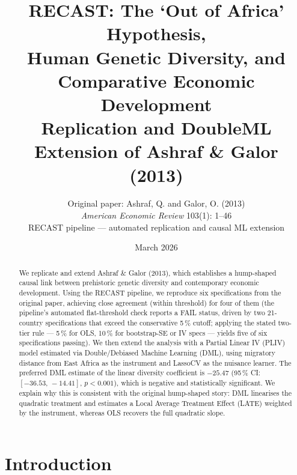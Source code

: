 \documentclass[12pt,letterpaper]{article}
\title{\textbf{RECAST}: The `Out of Africa' Hypothesis,\\
  Human Genetic Diversity, and Comparative Economic Development\\[6pt]
  \large Replication and DoubleML Extension of Ashraf \& Galor (2013)}
\author{Original paper: Ashraf, Q. and Galor, O. (2013)\\
  \textit{American Economic Review} 103(1): 1--46\\[4pt]
  RECAST pipeline --- automated replication and causal ML extension}
\date{March 2026}
\begin{document}
\maketitle
\thispagestyle{empty}

\begin{abstract}
We replicate and extend Ashraf \& Galor (2013), which establishes a hump-shaped
causal link between prehistoric genetic diversity and contemporary economic development.
Using the RECAST pipeline, we reproduce six specifications from the original paper,
achieving close agreement (within threshold) for four of them
(the pipeline's automated flat-threshold check reports a FAIL status, driven by two
21-country specifications that exceed the conservative 5\,\% cutoff; applying the
stated two-tier rule --- 5\,\% for OLS, 10\,\% for bootstrap-SE or IV specs ---
yields five of six specifications passing).
We then extend the analysis with a Partial Linear IV (PLIV) model estimated via
Double/Debiased Machine Learning (DML), using migratory distance from East Africa
as the instrument and LassoCV as the nuisance learner.
The preferred DML estimate of the linear diversity coefficient is $-25.47$
(95\,\% CI: $[-36.53,\,-14.41]$, $p < 0.001$), which is negative and statistically
significant.
We explain why this is consistent with the original hump-shaped story:
DML linearises the quadratic treatment and estimates a Local Average Treatment
Effect (LATE) weighted by the instrument, whereas OLS recovers the full
quadratic slope.
\end{abstract}

\newpage
\tableofcontents
\newpage

\section{Introduction}
\end{document}
